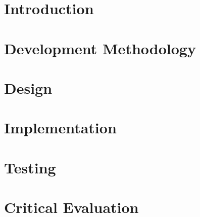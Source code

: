 \documentclass[11pt,a4paper,oneside]{book}
\begin{document}
\tableofcontents

\pagebreak

\mainmatter

\chapter{Introduction}


\chapter{ Development Methodology }


\chapter{Design}


\chapter{Implementation}


\chapter{Testing}
\label{chapter:testing}


\chapter{Critical Evaluation}


\pagebreak



\appendix

\end{document}
